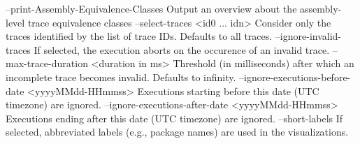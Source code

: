     --print-Assembly-Equivalence-Classes                Output an overview about
                                                        the assembly-level trace
                                                        equivalence classes
    --select-traces <id0 ... idn>                       Consider only the traces
                                                        identified by the list
                                                        of trace IDs. Defaults
                                                        to all traces.
    --ignore-invalid-traces                             If selected, the
                                                        execution aborts on the
                                                        occurence of an invalid
                                                        trace.
    --max-trace-duration <duration in ms>               Threshold (in
                                                        milliseconds) after
                                                        which an incomplete
                                                        trace becomes invalid.
                                                        Defaults to infinity.
    --ignore-executions-before-date <yyyyMMdd-HHmmss>   Executions starting
                                                        before this date (UTC
                                                        timezone) are ignored.
    --ignore-executions-after-date <yyyyMMdd-HHmmss>    Executions ending after
                                                        this date (UTC timezone)
                                                        are ignored.
    --short-labels                                      If selected, abbreviated
                                                        labels (e.g., package
                                                        names) are used in the
                                                        visualizations.